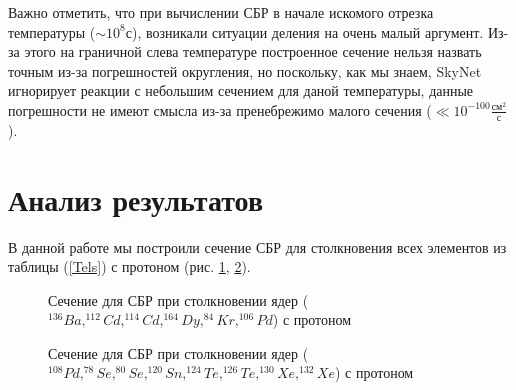 \documentclass[14pt, a4paper]{article}
\numberwithin{figure}{section}
\numberwithin{equation}{section}
\begin{document}
Важно отметить, что при вычислении СБР в начале искомого отрезка температуры ($\sim10^8\text{с}$), возникали ситуации деления на очень малый аргумент. Из-за этого на граничной слева температуре построенное сечение нельзя назвать точным из-за погрешностей округления, но поскольку, как мы знаем, SkyNet игнорирует реакции с небольшим сечением для даной температуры, данные погрешности не имеют смысла из-за пренебрежимо малого сечения ($\ll 10^{-100} \frac{\text{см}^2}{\text{с}}$).

\section{Анализ результатов}
В данной работе мы построили сечение СБР для столкновения всех элементов из таблицы (\ref{Tels}) с протоном (рис. \ref{ris:sigma-full}, \ref{ris:sigma-full-2}).

\begin{figure}
 	\caption{Сечение для СБР при столкновении ядер ($^{136}Ba, ^{112}Cd, ^{114}Cd, ^{164}Dy, ^{84}Kr, ^{106}Pd$) с протоном}
 	\label{ris:sigma-full}
\end{figure}
\begin{figure}
	\caption{Сечение для СБР при столкновении ядер ($^{108}Pd, ^{78}Se, ^{80}Se, ^{120}Sn, ^{124}Te, ^{126}Te, ^{130}Xe, ^{132}Xe$) с протоном}
	\label{ris:sigma-full-2}
\end{figure}
\end{document}
